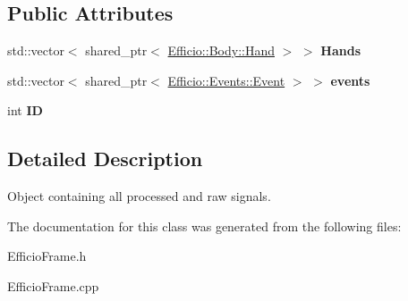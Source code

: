 \subsection*{Public Attributes}
\begin{DoxyCompactItemize}
\item 
std\+::vector$<$ shared\+\_\+ptr$<$ \hyperlink{class_efficio_1_1_body_1_1_hand}{Efficio\+::\+Body\+::\+Hand} $>$ $>$ {\bfseries Hands}\hypertarget{class_efficio_1_1_efficio_frame_a6a5460c24963053c38c592e9b4496feb}{}\label{class_efficio_1_1_efficio_frame_a6a5460c24963053c38c592e9b4496feb}

\item 
std\+::vector$<$ shared\+\_\+ptr$<$ \hyperlink{class_efficio_1_1_events_1_1_event}{Efficio\+::\+Events\+::\+Event} $>$ $>$ {\bfseries events}\hypertarget{class_efficio_1_1_efficio_frame_ad17423c3df18d08484817b511f5ccec9}{}\label{class_efficio_1_1_efficio_frame_ad17423c3df18d08484817b511f5ccec9}

\item 
int {\bfseries ID}\hypertarget{class_efficio_1_1_efficio_frame_aa994a72ec58afb3b6b64b9e05a9d0ba9}{}\label{class_efficio_1_1_efficio_frame_aa994a72ec58afb3b6b64b9e05a9d0ba9}

\end{DoxyCompactItemize}


\subsection{Detailed Description}
Object containing all processed and raw signals. 

The documentation for this class was generated from the following files\+:\begin{DoxyCompactItemize}
\item 
Efficio\+Frame.\+h\item 
Efficio\+Frame.\+cpp\end{DoxyCompactItemize}
